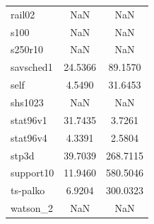 \begin{longtable}{lcc}
rail02 & NaN & NaN \\
s100 & NaN & NaN \\
s250r10 & NaN & NaN \\
savsched1 & 24.5366 & 89.1570 \\
self & 4.5490 & 31.6453 \\
shs1023 & NaN & NaN \\
stat96v1 & 31.7435 & 3.7261 \\
stat96v4 & 4.3391 & 2.5804 \\
stp3d & 39.7039 & 268.7115 \\
support10 & 11.9460 & 580.5046 \\
ts-palko & 6.9204 & 300.0323 \\
watson_2 & NaN & NaN \\
\end{longtable}
